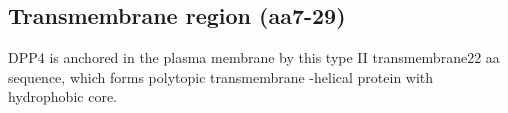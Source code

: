 \subsection{Transmembrane region (aa7-29)}

DPP4 is anchored in the plasma membrane by this type II transmembrane22 aa sequence, which forms polytopic transmembrane \alpha-helical protein with hydrophobic core.~\cite{Hong_1990}